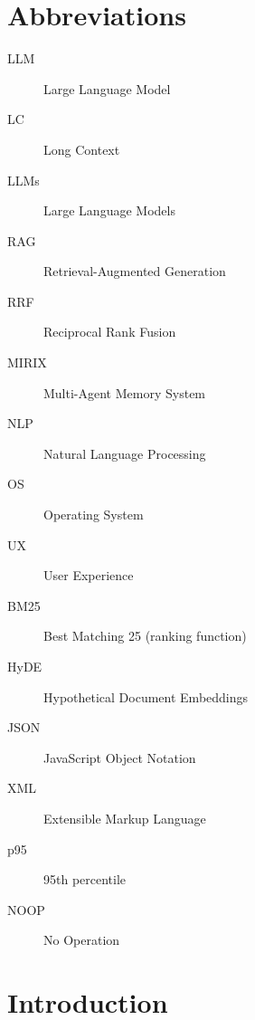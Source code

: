 ﻿\documentclass[12pt,a4paper]{article}
\begin{document}
\clearpage



\tableofcontents

\listoffigures
\clearpage


\section*{Abbreviations}

\begin{description}

    \item[LLM] Large Language Model
    \item[LC] Long Context
    \item[LLMs] Large Language Models

    \item[RAG] Retrieval-Augmented Generation
    \item[RRF] Reciprocal Rank Fusion

    \item[MIRIX] Multi-Agent Memory System

    \item[NLP] Natural Language Processing

    \item[OS] Operating System

    \item[UX] User Experience

    \item[BM25] Best Matching 25 (ranking function)

    \item[HyDE] Hypothetical Document Embeddings

    \item[JSON] JavaScript Object Notation

    \item[XML] Extensible Markup Language

    \item[p95] 95th percentile
    \item[NOOP] No Operation
\end{description}
\clearpage

\clearpage
{}
\setcounter{page}{1}


\section{Introduction}
\end{document}
